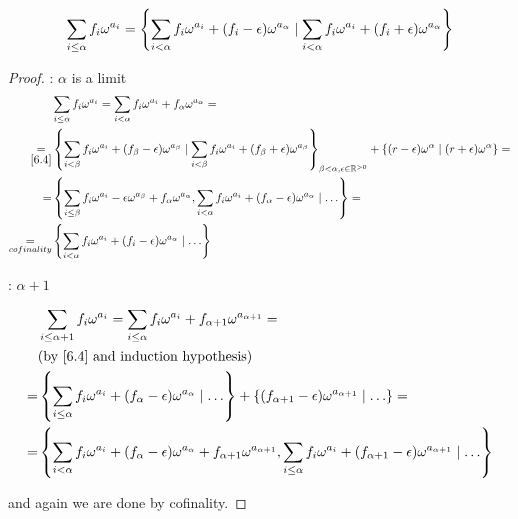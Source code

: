 
\begin{corollary} %
\begin{align*}
	\sum_{i \leq \alpha} f_i\omega^{a_i} =
	\left\{  \sum_{i < \alpha} f_i\omega^{a_i} + (f_i - \epsilon) \omega^{a_\alpha} \mid
	\sum_{i < \alpha} f_i\omega^{a_i} + (f_i + \epsilon) \omega^{a_\alpha}  \right\}
\end{align*}
 \end{corollary}

\begin{proof} %

: $\alpha$ is a limit
\begin{align*}
	&\sum_{i \leq \alpha} f_i\omega^{a_i} = \sum_{i < \alpha} f_i\omega^{a_i} + f_\alpha\omega^{a_\alpha} = \\ \underset{\eqref{6.4}}{=}
	&\left\{ \sum_{i < \beta} f_i \omega^{a_i} + (f_\beta - \epsilon)\omega^{a_\beta} \mid
	\sum_{i < \beta} f_i \omega^{a_i} + (f_\beta + \epsilon)\omega^{a_\beta} \right\}_{\beta < \alpha, \epsilon \in \mathbb{R}^{>0}}
	+ \left\{ (r - \epsilon) \omega^\alpha \mid (r+\epsilon)\omega^\alpha \right\} = \\ =
	&\left\{ \sum_{i \leq \beta} f_i \omega^{a_i} - \epsilon\omega^{a_\beta} + f_\alpha\omega^{a_\alpha},
	\sum_{i < \alpha} f_i \omega^{a_i} + (f_\alpha - \epsilon)\omega^{a_\alpha} \mid \ldots \right\} = \\ \underset{cofinality}{=}
	&\left\{  \sum_{i < \alpha} f_i\omega^{a_i} + (f_i - \epsilon) \omega^{a_\alpha} \mid \ldots  \right\}
\end{align*}

: $\alpha + 1$

\begin{align*}
	&\sum_{i \leq \alpha + 1} f_i \omega^{a_i} = \sum_{i \leq \alpha} f_i \omega^{a_i} + f_{\alpha + 1} \omega^{a_{\alpha + 1}} = \\
	&\text{(by \eqref{6.4} and induction hypothesis)} \\
	= &\left\{ \sum_{i \leq \alpha} f_i \omega^{a_i} + (f_{\alpha} - \epsilon) \omega^{a_\alpha} \mid \ldots \right\} +
	\left\{ (f_{\alpha + 1} - \epsilon) \omega^{a_{\alpha + 1}} \mid \ldots \right\} =  \\
	= &\left\{ \sum_{i < \alpha} f_i \omega^{a_i} + (f_{\alpha} - \epsilon) \omega^{a_\alpha} + f_{\alpha + 1} \omega^{a_{\alpha + 1}},
	\sum_{i \leq \alpha} f_i \omega^{a_i} + (f_{\alpha + 1} - \epsilon) \omega^{a_{\alpha + 1}} \mid \ldots \right\}
\end{align*}

and again we are done by cofinality.
 \end{proof}
